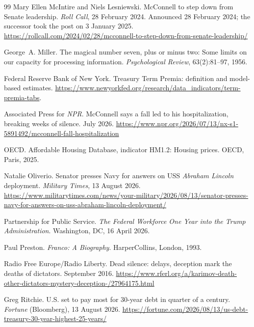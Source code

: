 \documentclass[11pt,a4paper]{article}
\theoremstyle{remark}
\begin{document}
\begin{thebibliography}{99}
Mary Ellen McIntire and Niels Lesniewski.
\newblock McConnell to step down from Senate leadership.
\newblock \emph{Roll Call}, 28 February 2024. Announced 28 February 2024; the successor took the post on
3 January 2025.
\newblock \url{https://rollcall.com/2024/02/28/mcconnell-to-step-down-from-senate-leadership/}

George~A. Miller.
\newblock The magical number seven, plus or minus two: Some limits on our capacity for processing information.
\newblock \emph{Psychological Review}, 63(2):81--97, 1956.

Federal Reserve Bank of New York.
\newblock Treasury Term Premia: definition and model-based estimates.
\newblock \url{https://www.newyorkfed.org/research/data_indicators/term-premia-tabs}.

Associated Press for \emph{NPR}.
\newblock McConnell says a fall led to his hospitalization, breaking weeks of silence.
 July 2026.
\newblock \url{https://www.npr.org/2026/07/13/nx-s1-5891492/mcconnell-fall-hospitalization}


OECD.
\newblock Affordable Housing Database, indicator HM1.2: Housing prices.
\newblock OECD, Paris, 2025.

Natalie Oliverio.
\newblock Senator presses Navy for answers on USS \emph{Abraham Lincoln} deployment.
\newblock \emph{Military Times}, 13 August 2026.
\newblock \url{https://www.militarytimes.com/news/your-military/2026/08/13/senator-presses-navy-for-answers-on-uss-abraham-lincoln-deployment/}

Partnership for Public Service.
\newblock \emph{The Federal Workforce One Year into the Trump Administration}.
\newblock Washington, DC, 16 April 2026.


Paul Preston.
\newblock \emph{Franco: A Biography}.
\newblock HarperCollins, London, 1993.

Radio Free Europe/Radio Liberty.
\newblock Dead silence: delays, deception mark the deaths of dictators.
 September 2016.
\newblock \url{https://www.rferl.org/a/karimov-death-other-dictators-mystery-deception-/27964175.html}


Greg Ritchie.
\newblock U.S. set to pay most for 30-year debt in quarter of a century.
\newblock \emph{Fortune} (Bloomberg), 13 August 2026.
\newblock \url{https://fortune.com/2026/08/13/us-debt-treasury-30-year-highest-25-years/}


\end{thebibliography}
\end{document}
